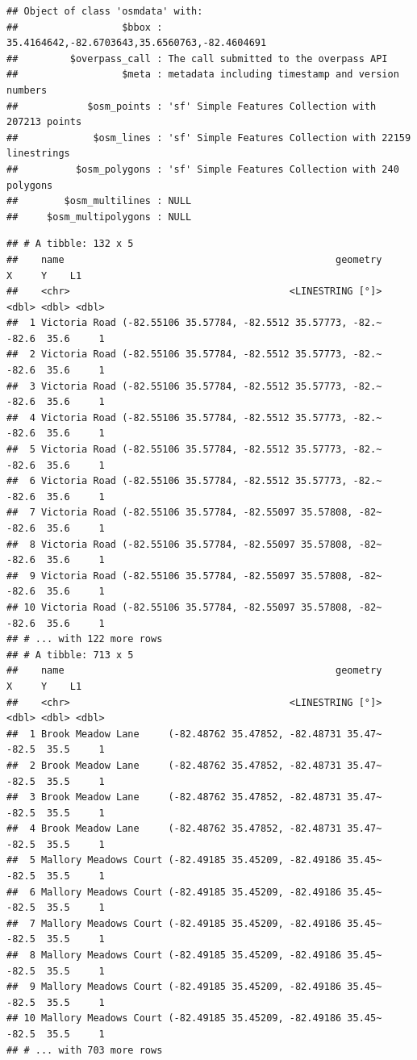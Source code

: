 \documentclass[
]{article}
\begin{document}
\begin{verbatim}
## Object of class 'osmdata' with:
##                  $bbox : 35.4164642,-82.6703643,35.6560763,-82.4604691
##         $overpass_call : The call submitted to the overpass API
##                  $meta : metadata including timestamp and version numbers
##            $osm_points : 'sf' Simple Features Collection with 207213 points
##             $osm_lines : 'sf' Simple Features Collection with 22159 linestrings
##          $osm_polygons : 'sf' Simple Features Collection with 240 polygons
##        $osm_multilines : NULL
##     $osm_multipolygons : NULL
\end{verbatim}

\begin{verbatim}
## # A tibble: 132 x 5
##    name                                               geometry     X     Y    L1
##    <chr>                                      <LINESTRING [°]> <dbl> <dbl> <dbl>
##  1 Victoria Road (-82.55106 35.57784, -82.5512 35.57773, -82.~ -82.6  35.6     1
##  2 Victoria Road (-82.55106 35.57784, -82.5512 35.57773, -82.~ -82.6  35.6     1
##  3 Victoria Road (-82.55106 35.57784, -82.5512 35.57773, -82.~ -82.6  35.6     1
##  4 Victoria Road (-82.55106 35.57784, -82.5512 35.57773, -82.~ -82.6  35.6     1
##  5 Victoria Road (-82.55106 35.57784, -82.5512 35.57773, -82.~ -82.6  35.6     1
##  6 Victoria Road (-82.55106 35.57784, -82.5512 35.57773, -82.~ -82.6  35.6     1
##  7 Victoria Road (-82.55106 35.57784, -82.55097 35.57808, -82~ -82.6  35.6     1
##  8 Victoria Road (-82.55106 35.57784, -82.55097 35.57808, -82~ -82.6  35.6     1
##  9 Victoria Road (-82.55106 35.57784, -82.55097 35.57808, -82~ -82.6  35.6     1
## 10 Victoria Road (-82.55106 35.57784, -82.55097 35.57808, -82~ -82.6  35.6     1
## # ... with 122 more rows
## # A tibble: 713 x 5
##    name                                               geometry     X     Y    L1
##    <chr>                                      <LINESTRING [°]> <dbl> <dbl> <dbl>
##  1 Brook Meadow Lane     (-82.48762 35.47852, -82.48731 35.47~ -82.5  35.5     1
##  2 Brook Meadow Lane     (-82.48762 35.47852, -82.48731 35.47~ -82.5  35.5     1
##  3 Brook Meadow Lane     (-82.48762 35.47852, -82.48731 35.47~ -82.5  35.5     1
##  4 Brook Meadow Lane     (-82.48762 35.47852, -82.48731 35.47~ -82.5  35.5     1
##  5 Mallory Meadows Court (-82.49185 35.45209, -82.49186 35.45~ -82.5  35.5     1
##  6 Mallory Meadows Court (-82.49185 35.45209, -82.49186 35.45~ -82.5  35.5     1
##  7 Mallory Meadows Court (-82.49185 35.45209, -82.49186 35.45~ -82.5  35.5     1
##  8 Mallory Meadows Court (-82.49185 35.45209, -82.49186 35.45~ -82.5  35.5     1
##  9 Mallory Meadows Court (-82.49185 35.45209, -82.49186 35.45~ -82.5  35.5     1
## 10 Mallory Meadows Court (-82.49185 35.45209, -82.49186 35.45~ -82.5  35.5     1
## # ... with 703 more rows
\end{verbatim}
\end{document}
